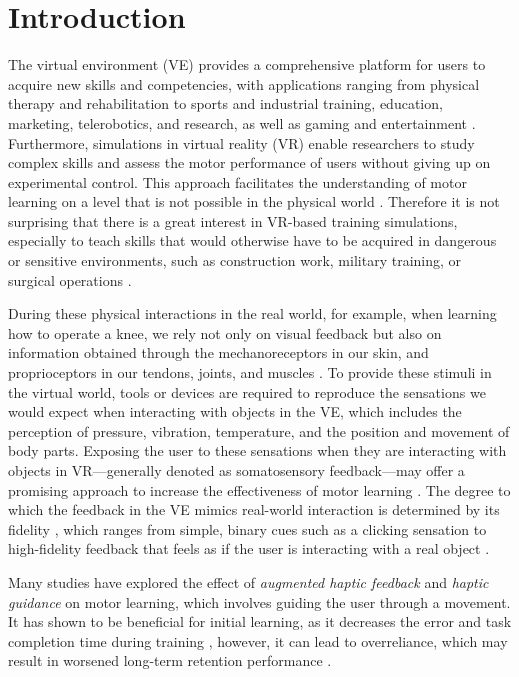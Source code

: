 
\section{Introduction}
The virtual environment (VE) provides a comprehensive platform for users to acquire new skills and competencies, with applications ranging from physical therapy and rehabilitation to sports and industrial training, education, marketing, telerobotics, and research, as well as gaming and entertainment \cite{Wu2023TrainingReality, Oagaz2022PerformanceReality}. 
Furthermore, simulations in virtual reality (VR) enable researchers to study complex skills and assess the motor performance of users without giving up on experimental control. This approach facilitates the understanding of motor learning on a level that is not possible in the physical world \cite{Harris2021ExploringSimulator, Levac2019LearningReview}. 
Therefore it is not surprising that there is a great interest in VR-based training simulations, especially to teach skills that would otherwise have to be acquired in dangerous or sensitive environments, such as construction work, military training, or surgical operations \cite{Adami2021EffectivenessTeleoperation, Lele2013VirtualUtility, Qi2021VirtualScenario}.

During these physical interactions in the real world, for example, when learning how to operate a knee, we rely not only on visual feedback but also on information obtained through the mechanoreceptors in our skin, and proprioceptors in our tendons, joints, and muscles \cite{Gonzalez-Grandon2021ProprioceptionInteraction}. To provide these stimuli in the virtual world, tools or devices are required to reproduce the sensations we would expect when interacting with objects in the VE, which includes the perception of pressure, vibration, temperature, and the position and movement of body parts. Exposing the user to these sensations when they are interacting with objects in VR---generally denoted as somatosensory feedback---may offer a promising approach to increase the effectiveness of motor learning \cite{Sigrist2013AugmentedReview}. 
The degree to which the feedback in the VE mimics real-world interaction is determined by its fidelity \cite{Caird1996PersistentTraining}, which ranges from simple, binary cues such as a clicking sensation to high-fidelity feedback that feels as if the user is interacting with a real object \cite{Yang2023}.

Many studies have explored the effect of \textit{augmented haptic feedback} and \textit{haptic guidance} on motor learning, which involves guiding the user through a movement. It has shown to be beneficial for initial learning, as it decreases the error and task completion time during training \cite{Caccianiga2021, LeeH2014}, however, it can lead to overreliance, which may result in worsened long-term retention performance \cite{Oquendo2024}. 

